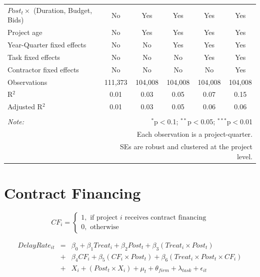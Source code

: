 \documentclass[]{article}
\begin{document}
\begin{table}[H]
\begin{tabular}{@{\extracolsep{-2pt}}lccccc}
$Post_t \times$  (Duration, Budget, Bids) & No & Yes & Yes & Yes & Yes \\ 
Project age & No & Yes & Yes & Yes & Yes \\ 
Year-Quarter fixed effects & No & No & Yes & Yes & Yes \\ 
Task fixed effects & No & No & No & Yes & Yes \\ 
Contractor fixed effects & No & No & No & No & Yes \\ 
Observations & 111,373 & 104,008 & 104,008 & 104,008 & 104,008 \\ 
R$^{2}$ & 0.01 & 0.03 & 0.05 & 0.07 & 0.15 \\ 
Adjusted R$^{2}$ & 0.01 & 0.03 & 0.05 & 0.06 & 0.06 \\ 
\hline 
\hline \\[-1.8ex] 
\textit{Note:}  & \multicolumn{5}{r}{$^{*}$p$<$0.1; $^{**}$p$<$0.05; $^{***}$p$<$0.01} \\ 
 & \multicolumn{5}{r}{Each observation is a project-quarter.} \\ 
 & \multicolumn{5}{r}{SEs are robust and clustered at the project level.} \\ 
\end{tabular} 
\end{table}

\hypertarget{contract-financing}{%
\section{Contract Financing}\label{contract-financing}}

\[ CF_i = \begin{cases} 1, \text{ if project } i \text{ receives contract financing}\\
0, \text{ otherwise} \end{cases}\]

\[ \begin{aligned}
DelayRate_{it} &=& \beta_0+\beta_1 Treat_i + \beta_2 Post_t + \beta_3 (Treat_i \times Post_t) \\
&+&\beta_4 CF_i + \beta_5 (CF_i \times Post_t) + \beta_6 (Treat_i \times Post_t \times CF_i) \\ 
&+&X_i + (Post_t \times X_i) + \mu_t + \theta_{firm} + \lambda_{task}+ \epsilon_{it}
\end{aligned}\]
\end{document}
